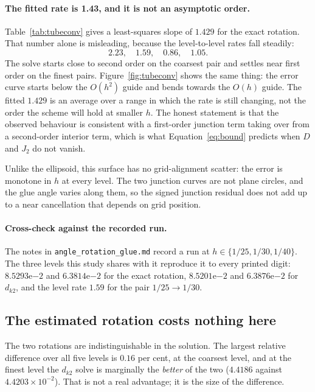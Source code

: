 \paragraph{The fitted rate is 1.43, and it is not an asymptotic order.}
Table~\ref{tab:tubeconv} gives a least-squares slope of $1.429$ for the
exact rotation. That number alone is misleading, because the
level-to-level rates fall steadily:
\begin{equation*}
  2.23, \quad 1.59, \quad 0.86, \quad 1.05 .
\end{equation*}
The solve starts close to second order on the coarsest pair and settles
near first order on the finest pairs. Figure~\ref{fig:tubeconv} shows the
same thing: the error curve starts below the $O(h^2)$ guide and bends
towards the $O(h)$ guide. The fitted $1.429$ is an average over a range
in which the rate is still changing, not the order the scheme will hold
at smaller $h$. The honest statement is that the observed behaviour is
consistent with a first-order junction term taking over from a
second-order interior term, which is what Equation~\eqref{eq:bound}
predicts when $D$ and $J_2$ do not vanish.

Unlike the ellipsoid, this surface has no grid-alignment scatter: the
error is monotone in $h$ at every level. The two junction curves are not
plane circles, and the glue angle varies along them, so the signed
junction residual does not add up to a near cancellation that depends on
grid position.

\paragraph{Cross-check against the recorded run.} The notes in
\texttt{angle\_rotation\_glue.md} record a run at
$h\in\{1/25, 1/30, 1/40\}$. The three levels this study shares with it
reproduce it to every printed digit: $8.5293\mathrm{e}{-2}$ and
$6.3814\mathrm{e}{-2}$ for the exact rotation, $8.5201\mathrm{e}{-2}$ and
$6.3876\mathrm{e}{-2}$ for $d_{k2}$, and the level rate $1.59$ for the
pair $1/25 \to 1/30$.

\subsection{The estimated rotation costs nothing here}

The two rotations are indistinguishable in the solution. The largest
relative difference over all five levels is $0.16$ per cent, at the
coarsest level, and at the finest level the $d_{k2}$ solve is marginally
the \emph{better} of the two ($4.4186$ against
$4.4203 \times 10^{-2}$). That is not a real advantage; it is the size
of the difference.

